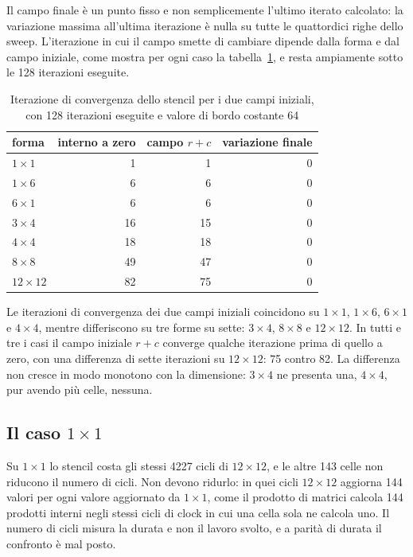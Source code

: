 Il campo finale è un punto fisso e non semplicemente l'ultimo iterato calcolato: 
la variazione massima all'ultima iterazione è nulla su tutte le quattordici 
righe dello sweep. L'iterazione in cui il campo smette di cambiare dipende dalla forma e dal
campo iniziale, come mostra per ogni caso la tabella~\ref{tab:convergenza}, e
resta ampiamente sotto le 128 iterazioni eseguite.

\begin{table}[htbp]
    \centering
    \begin{tabular}{lrrr}
        \toprule
        forma & interno a zero & campo $r+c$ & variazione finale \\
        \midrule
        $1\times1$   & 1  & 1  & 0 \\
        $1\times6$   & 6  & 6  & 0 \\
        $6\times1$   & 6  & 6  & 0 \\
        $3\times4$   & 16 & 15 & 0 \\
        $4\times4$   & 18 & 18 & 0 \\
        $8\times8$   & 49 & 47 & 0 \\
        $12\times12$ & 82 & 75 & 0 \\
        \bottomrule
    \end{tabular}
    \caption{Iterazione di convergenza dello stencil per i due campi iniziali,
             con 128 iterazioni eseguite e valore di bordo costante 64}
    \label{tab:convergenza}
\end{table}

Le iterazioni di convergenza dei due campi iniziali coincidono su $1\times1$, 
$1\times6$, $6\times1$ e $4\times4$, mentre differiscono su tre forme su sette: 
$3\times4$, $8\times8$ e $12\times12$. In tutti e tre i casi il campo iniziale 
$r+c$ converge qualche iterazione prima di quello a zero, con una differenza di 
sette iterazioni su $12\times12$: 75 contro 82. La differenza non cresce in
modo monotono con la dimensione: $3\times4$ ne presenta una, $4\times4$, pur
avendo più celle, nessuna.

\subsection{Il caso $1\times1$}
\label{sec:unoxuno}

Su $1\times1$ lo stencil costa gli stessi 4227 cicli di $12\times12$, e le
altre 143 celle non riducono il numero di cicli. Non devono ridurlo: in quei
cicli $12\times12$ aggiorna 144 valori per ogni valore aggiornato da
$1\times1$, come il prodotto di matrici calcola 144 prodotti interni negli stessi cicli di clock in cui una cella sola ne calcola uno. Il numero di cicli misura la durata e non
il lavoro svolto, e a parità di durata il confronto è mal posto.

